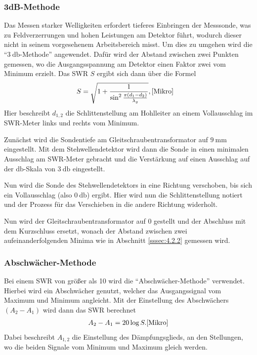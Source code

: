             \subsubsection{3dB-Methode}
                Das Messen starker Welligkeiten erfordert tieferes Einbringen der Messsonde, was zu Feldverzerrungen und hohen Leistungen am Detektor führt, wodurch dieser
                nicht in seinem vorgesehenem Arbeitsbereich misst.
                Um dies zu umgehen wird die \enquote{$\SI{3}{\decibel}$-Methode} angewendet.
                Dafür wird der Abstand zwischen zwei Punkten gemessen, wo die Ausgangsspannung am Detektor 
                einen Faktor zwei vom Minimum erzielt. Das SWR $S$ ergibt sich dann über die Formel
                \begin{align}
                    S &= \sqrt{1+\frac{1}{\sin ^2 \frac{\pi (d_1-d_2)}{\lambda_g}}} \label{eq:2}, \text{\cite{Mikro}}
                \end{align}
                Hier beschreibt $d_{1,2}$ die Schlittenstellung am Hohlleiter an einem Vollausschlag im SWR-Meter links und rechts vom Minimum.
            
                Zunächst wird die Sondentiefe am Gleitschraubentransformator auf $\SI{9}{\milli\metre}$ eingestellt.
                Mit dem Stehwellendetektor wird dann die Sonde in einen minimalen Ausschlag am SWR-Meter gebracht und die Verstärkung auf einen Ausschlag auf der $\si{\decibel}$-Skala von $\SI{3}{\decibel}$ eingestellt.
                
                Nun wird die Sonde des Stehwellendetektors in eine Richtung verschoben, bis sich ein Vollausschlag (also $\SI{0}{\decibel}$) ergibt.
                Hier wird nun die Schlittenstellung notiert und der Prozess für das Verschieben in die andere Richtung widerholt.

                Nun wird der Gleitschraubentransformator auf 0 gestellt und der Abschluss mit dem Kurzschluss ersetzt, wonach der Abstand zwischen zwei aufeinanderfolgenden Minima wie in Abschnitt \ref{sssec:4.2.2} gemessen wird.
                
            \subsubsection{Abschwächer-Methode}
                Bei einem SWR von größer als 10 wird die \enquote{Abschwächer-Methode} verwendet.
                Hierbei wird ein Abschwächer genutzt, welcher das Ausgangssignal vom Maximum und Minimum angleicht. %
                Mit der Einstellung des Abschwächers $(A_2-A_1) $ wird dann das SWR berechnet
                \begin{align}
                    A_2-A_1 = 20 \log S \label{eq:3}. \text{\cite{Mikro}}
                \end{align}
                Dabei beschreibt $A_{1,2}$ die Einstellung des Dämpfungsglieds, an den Stellungen, wo die beiden Signale vom Minimum und Maximum gleich werden.
            
